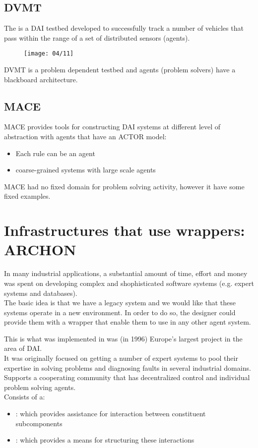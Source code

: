 \subsection{DVMT}
The  is a DAI testbed developed to successfully track a number of vehicles that pass within the range of a set of distributed sensors (agents).

\begin{figure}[!h]
\centering
\texttt{[image: 04/11]}
\end{figure}

DVMT is a problem dependent testbed and agents (problem solvers) have a blackboard architecture.

\subsection{MACE}

MACE provides tools for constructing DAI systems at different level of abstraction with agents that have an ACTOR model:
\begin{itemize}
\item Each rule can be an agent
\item coarse-grained systems with large scale agents
\end{itemize}
MACE had no fixed domain for problem solving activity, however it have some fixed examples. 

\section{Infrastructures that use wrappers: ARCHON}
In many industrial applications, a substantial amount of time, effort and money was spent on developing complex and shophisticated software systems (e.g. expert systems and databases).\\
The basic idea is that we have a legacy system and we would like that these systems operate in a new environment. In order to do so, the designer could provide them with a wrapper that enable them to use in any other agent system.

This is what was implemented in  was (in 1996) Europe's largest project in the area of DAI.\\
It was originally focused on getting a number of expert systems to pool their expertise in solving problems and diagnosing faults in several industrial domains.\\
Supports a cooperating community that has decentralized control and individual problem solving agents.\\
Consists of a:
\begin{itemize}
\item {}: which provides assistance for interaction between constituent subcomponents
\item {}: which provides a means for structuring these interactions
\end{itemize}

